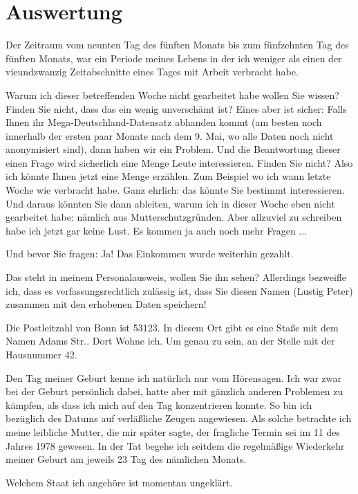 \section{Auswertung}
Der Zeitraum vom neunten Tag des fünften Monats bis zum fünfzehnten Tag des fünften Monats, war ein Periode meines Lebens in der ich weniger als einen der vieundzwanzig Zeitabschnitte eines Tages mit Arbeit verbracht habe.

Warum ich dieser betreffenden Woche nicht gearbeitet habe wollen Sie wissen? Finden Sie nicht, dass das ein wenig unverschämt ist? Eines aber ist sicher: Falls Ihnen ihr Mega-Deutschland-Datensatz abhanden kommt (am besten noch innerhalb der ersten paar Monate nach dem 9. Mai, wo alle Daten noch nicht anonymisiert sind), dann haben wir ein Problem. Und die Beantwortung dieser einen Frage wird sicherlich eine Menge Leute interessieren. Finden Sie nicht? Also ich könnte Ihnen jetzt eine Menge erzählen. Zum Beispiel wo ich wann letzte Woche wie verbracht habe. Ganz ehrlich: das könnte Sie bestimmt interessieren. Und daraus könnten Sie dann ableiten, warum ich in dieser Woche eben nicht gearbeitet habe: nämlich aus Mutterschutzgründen. Aber allzuviel zu schreiben habe ich jetzt gar keine Lust. Es kommen ja auch noch mehr Fragen ...

Und bevor Sie fragen: Ja! Das Einkommen wurde weiterhin gezahlt.

Das steht in meinem Personalausweis, wollen Sie ihn sehen? Allerdings bezweifle ich, dass es verfassungsrechtlich zulässig ist, dass Sie diesen Namen (Lustig Peter) zusammen mit den erhobenen Daten speichern!

Die Postleitzahl von Bonn ist 53123. In diesem Ort gibt es eine Staße mit dem Namen Adams Str.. Dort Wohne ich. Um genau zu sein, an der Stelle mit der Hausnummer 42.

Den Tag meiner Geburt kenne ich natürlich nur vom Hörensagen. Ich war zwar bei der Geburt persönlich dabei, hatte aber mit gänzlich anderen Problemen zu kämpfen, als dass ich mich auf den Tag konzentrieren konnte. So bin ich bezüglich des Datums auf verläßliche Zeugen angewiesen. Als solche betrachte ich meine leibliche Mutter, die mir später sagte, der fragliche Termin sei im 11 des Jahres 1978 gewesen. In der Tat begehe ich seitdem die regelmäßige Wiederkehr meiner Geburt am jeweils 23 Tag des nämlichen Monats.

Welchem Staat ich angehöre ist momentan ungeklärt.
